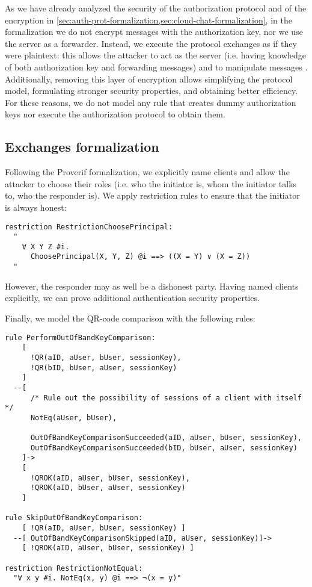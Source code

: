 As we have already analyzed the security of the authorization protocol and of the \cchat{} encryption in \cref{sec:auth-prot-formalization,sec:cloud-chat-formalization}, in the formalization we do not encrypt messages with the authorization key, nor we use the server as a forwarder. Instead, we execute the \schat{} protocol exchanges as if they were plaintext: this allows the attacker to act as the server (i.e. having knowledge of both authorization key and forwarding messages) and to manipulate messages \cite{MTProto2-Proverif}. Additionally, removing this layer of encryption allows simplifying the protocol model, formulating stronger security properties, and obtaining better efficiency. For these reasons, we do not model any rule that creates dummy authorization keys nor execute the authorization protocol to obtain them.

\subsection{Exchanges formalization}


Following the Proverif formalization, we explicitly name clients and allow the attacker to choose their roles (i.e. who the initiator is, whom the initiator talks to, who the responder is). We apply restriction rules to ensure that the initiator is always honest:

\begin{lstlisting}
restriction RestrictionChoosePrincipal:
  "
    ∀ X Y Z #i.
      ChoosePrincipal(X, Y, Z) @i ==> ((X = Y) ∨ (X = Z))
  "
\end{lstlisting}

However, the responder may as well be a dishonest party. Having named clients explicitly, we can prove additional authentication security properties.

Finally, we model the QR-code comparison with the following rules:

\begin{lstlisting}
rule PerformOutOfBandKeyComparison:
    [ 
      !QR(aID, aUser, bUser, sessionKey),
      !QR(bID, bUser, aUser, sessionKey)
    ]
  --[ 
      /* Rule out the possibility of sessions of a client with itself */
      NotEq(aUser, bUser),

      OutOfBandKeyComparisonSucceeded(aID, aUser, bUser, sessionKey),
      OutOfBandKeyComparisonSucceeded(bID, bUser, aUser, sessionKey)
    ]->
    [
      !QROK(aID, aUser, bUser, sessionKey),
      !QROK(aID, bUser, aUser, sessionKey)
    ]

rule SkipOutOfBandKeyComparison:
    [ !QR(aID, aUser, bUser, sessionKey) ]
  --[ OutOfBandKeyComparisonSkipped(aID, aUser, sessionKey)]->
    [ !QROK(aID, aUser, bUser, sessionKey) ]

restriction RestrictionNotEqual:
  "∀ x y #i. NotEq(x, y) @i ==> ¬(x = y)"
\end{lstlisting}

